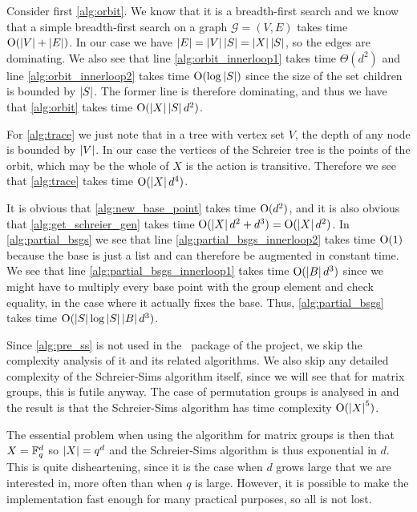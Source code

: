 Consider first \ref{alg:orbit}. We know that it is a breadth-first
search and we know that a simple breadth-first search on a graph
$\mathcal{G} = (V, E)$ takes time $\operatorname{O} ( \left\lvert V \right\rvert + \left\lvert E \right\rvert )$. In our case
we have $\left\lvert E \right\rvert = \left\lvert V \right\rvert \left\lvert S \right\rvert = \left\lvert X \right\rvert \left\lvert S \right\rvert$, so the edges
are dominating. We also see that line \ref{alg:orbit_innerloop1}
takes time $\Theta(d^2)$ and line \ref{alg:orbit_innerloop2} takes
time $\operatorname{O} ( \log{\left\lvert S \right\rvert} )$ since the size of the set
\textsf{children} is bounded by $\left\lvert S \right\rvert$. The former line is therefore dominating, and thus we have that
\ref{alg:orbit} takes time $\operatorname{O} ( \left\lvert X \right\rvert\left\lvert S \right\rvert d^2 )$.

For \ref{alg:trace} we just note that in a tree with vertex set $V$,
the depth of any node is bounded by $\left\lvert V \right\rvert$. In our case the
vertices of the Schreier tree is the points of the orbit, which may be
the whole of $X$ is the action is transitive. Therefore we see that
\ref{alg:trace} takes time $\operatorname{O} ( \left\lvert X \right\rvert d^4 )$.

It is obvious that \ref{alg:new_base_point} takes time $\operatorname{O} ( d^2 )$, and
it is also obvious that \ref{alg:get_schreier_gen} takes time
$\operatorname{O} ( \left\lvert X \right\rvert d^2 + d^3 ) = \operatorname{O} ( \left\lvert X \right\rvert d^2 )$. In \ref{alg:partial_bsgs}
we see that line \ref{alg:partial_bsgs_innerloop2} takes time $\operatorname{O} ( 1 )$
because the base is just a list and can therefore be augmented in
constant time. We see that line \ref{alg:partial_bsgs_innerloop1}
takes time $\operatorname{O} ( \left\lvert B \right\rvert d^3 )$ since we might have to multiply every
base point with the group element and check equality, in the case
where it actually fixes the base. Thus, \ref{alg:partial_bsgs} takes
time $\operatorname{O} ( \left\lvert S \right\rvert \log{\left\lvert S \right\rvert} \left\lvert B \right\rvert d^3 )$.

Since \ref{alg:pre_ss} is not used in the \GAP~package of the project,
we skip the complexity analysis of it and its related algorithms. We also skip any detailed complexity
of the Schreier-Sims algorithm itself, since we will see that for
matrix groups, this is futile anyway. The case of permutation groups is
analysed in \cite{butler91} and the result is that the Schreier-Sims
algorithm has time complexity $\operatorname{O} ( \left\lvert X \right\rvert^5 )$. 

The essential problem
when using the algorithm for matrix groups is then that $X = \mathbb{F}_q^d$
so $\left\lvert X \right\rvert = q^d$ and the Schreier-Sims algorithm is thus exponential
in $d$. This is quite disheartening, since it is the case when $d$
grows large that we are interested in, more often than when $q$ is
large. However, it is possible to make the implementation fast enough for many practical purposes, so all is not lost.

